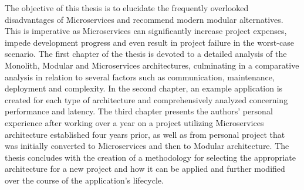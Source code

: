 The objective of this thesis is to elucidate the frequently overlooked disadvantages of Microservices and recommend modern modular alternatives. This is imperative as Microservices can significantly increase project expenses, impede development progress and even result in project failure in the worst-case scenario. The first chapter of the thesis is devoted to a detailed analysis of the Monolith, Modular and Microservices architectures, culminating in a comparative analysis in relation to several factors such as communication, maintenance, deployment and complexity. In the second chapter, an example application is created for each type of architecture and comprehensively analyzed concerning performance and latency. The third chapter presents the authors' personal experience after working over a year on a project utilizing Microservices architecture established four years prior, as well as from personal project that was initially converted to Microservices and then to Modular architecture. The thesis concludes with the creation of a methodology for selecting the appropriate architecture for a new project and how it can be applied and further modified over the course of the application's lifecycle.






